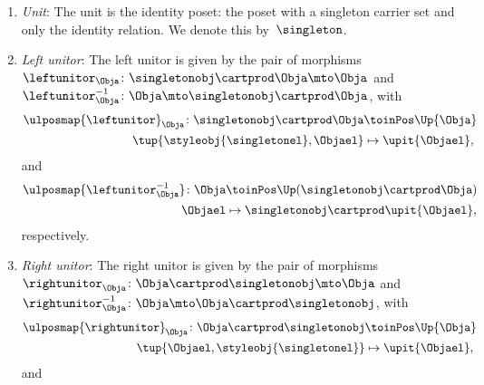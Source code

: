 \begin{lemma}
\begin{enumerate}
        \item \emph{Unit}: The unit is the identity poset: the poset with a singleton carrier set and only the identity relation.
              We denote this by~$\singleton$.
        \item \emph{Left unitor}: The left unitor is given by the pair of morphisms~$\leftunitor_\Obja\colon \singletonobj\cartprod \Obja \mto \Obja$ and~$\leftunitor_\Obja^{-1}\colon \Obja \mto \singletonobj\cartprod \Obja$, with
              \begin{equation}
                  \begin{aligned}
                      \ulposmap{\leftunitor}_\Obja\colon \singletonobj\cartprod \Obja & \toinPos \Up{\Obja}       \\
                      \tup{\styleobj{\singletonel},\Objael}                           & \mapsto \upit\{\Objael\},
                  \end{aligned}
              \end{equation}
              and
              \begin{equation}
                  \begin{aligned}
                      \ulposmap{\leftunitor_{\Obja}^{-1}}\colon \Obja & \toinPos \Up(\singletonobj\cartprod \Obja)         \\
                      \Objael                                         & \mapsto \singletonobj \cartprod \upit \{\Objael\},
                  \end{aligned}
              \end{equation}
              respectively.
        \item \emph{Right unitor}: The right unitor is given by the pair of morphisms~$\rightunitor_\Obja\colon \Obja\cartprod \singletonobj  \mto \Obja$ and~$\rightunitor_\Obja^{-1}\colon \Obja \mto \Obja \cartprod \singletonobj$, with
              \begin{equation}
                  \begin{aligned}
                      \ulposmap{\rightunitor}_\Obja\colon \Obja\cartprod \singletonobj & \toinPos \Up{\Obja}       \\
                      \tup{\Objael,\styleobj{\singletonel}}                            & \mapsto \upit\{\Objael\},
                  \end{aligned}
              \end{equation}
              and
              \begin{equation}
                  \begin{aligned}

\end{aligned}
\end{equation}
\end{enumerate}
\end{lemma}

